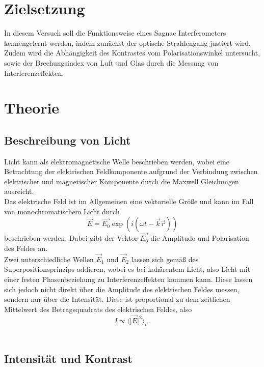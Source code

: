 \section{Zielsetzung}
In diesem Versuch soll die Funktionsweise eines Sagnac Interferometers kennengelernt werden,
indem zunächst der optische Strahlengang justiert wird. Zudem wird die Abhängigkeit des
Kontrastes vom Polarisationswinkel untersucht, sowie der Brechungsindex von Luft und Glas durch die Messung von
Interferenzeffekten.

\section{Theorie}
\label{sec:Theorie}
\subsection{Beschreibung von Licht}

Licht kann als elektromagnetische Welle beschrieben werden, wobei eine Betrachtung der
elektrischen Feldkomponente aufgrund der Verbindung zwischen elektrischer und
magnetischer Komponente durch die Maxwell Gleichungen ausreicht. \\
Das elektrische Feld ist im Allgemeinen eine vektorielle Größe und kann im Fall von
monochromatischem Licht durch
\begin{equation}
  \vec{E}=\vec{E_0}\exp{\left(i (\omega t-\vec{k}\vec{r})\right)}
\end{equation}
beschrieben werden. Dabei gibt der Vektor $\vec{E_0}$ die Amplitude und Polarisation des Feldes
an. \\
Zwei unterschiedliche Wellen $\vec{E}_1$ und $\vec{E}_2$ lassen sich gemäß des
Superpositionsprinzips addieren, wobei es bei kohärentem Licht, also Licht mit einer festen Phasenbeziehung
zu Interferenzeffekten kommen kann. Diese lassen sich jedoch nicht direkt über die Amplitude
des elektrischen Feldes messen, sondern nur über die Intensität. Diese ist proportional
zu dem zeitlichen Mittelwert des Betragsquadrats des elektrischen Feldes, also
\begin{equation}
  I \propto \langle \lvert \vec{E} \rvert^2 \rangle_t \: .
\end{equation} \\
\subsection{Intensität und Kontrast}

